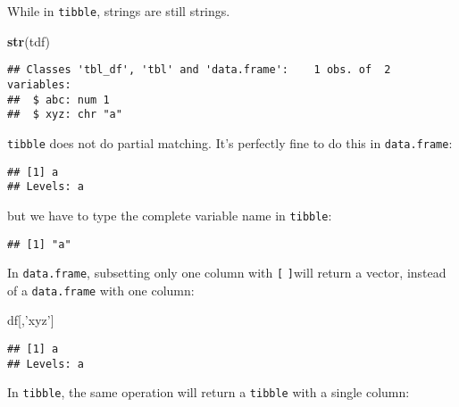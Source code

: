 \documentclass[]{article}
\newenvironment{Shaded}{\begin{snugshade}}{\end{snugshade}}
\newcommand{\KeywordTok}[1]{\textcolor[rgb]{0.13,0.29,0.53}{\textbf{#1}}}
\newcommand{\StringTok}[1]{\textcolor[rgb]{0.31,0.60,0.02}{#1}}
\newcommand{\OperatorTok}[1]{\textcolor[rgb]{0.81,0.36,0.00}{\textbf{#1}}}
\newcommand{\NormalTok}[1]{#1}
\theoremstyle{definition}
\theoremstyle{definition}
\theoremstyle{definition}
\theoremstyle{remark}
\begin{document}
While in \texttt{tibble}, strings are still strings.

\begin{Shaded}
\begin{Highlighting}[]
\KeywordTok{str}\NormalTok{(tdf)}
\end{Highlighting}
\end{Shaded}

\begin{verbatim}
## Classes 'tbl_df', 'tbl' and 'data.frame':    1 obs. of  2 variables:
##  $ abc: num 1
##  $ xyz: chr "a"
\end{verbatim}

\texttt{tibble} does not do partial matching. It's perfectly fine to do
this in \texttt{data.frame}:

\begin{Shaded}
\end{Shaded}

\begin{verbatim}
## [1] a
## Levels: a
\end{verbatim}

but we have to type the complete variable name in \texttt{tibble}:

\begin{Shaded}
\end{Shaded}

\begin{verbatim}
## [1] "a"
\end{verbatim}

In \texttt{data.frame}, subsetting only one column with \texttt{{[}}
\texttt{{]}}will return a vector, instead of a \texttt{data.frame} with
one column:

\begin{Shaded}
\begin{Highlighting}[]
\NormalTok{df[,}\StringTok{'xyz'}\NormalTok{]}
\end{Highlighting}
\end{Shaded}

\begin{verbatim}
## [1] a
## Levels: a
\end{verbatim}

In \texttt{tibble}, the same operation will return a \texttt{tibble}
with a single column:
\end{document}
